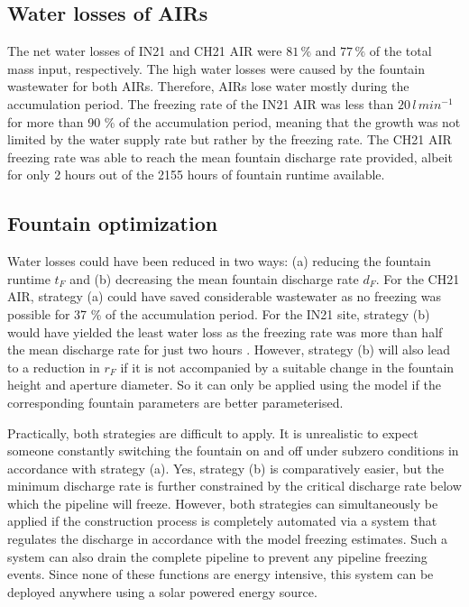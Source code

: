 \documentclass[utf8]{frontiersSCNS}
\begin{document}
\subsection{Water losses of AIRs}

The net water losses of IN21 and CH21 AIR were $81\,\%$ and $77\,\%$ of the total mass input, respectively. The
high water losses were caused by the fountain wastewater for both AIRs. Therefore, AIRs lose water mostly
during the accumulation period. The freezing rate of the IN21 AIR was less than $20 \, l\,min^{-1}$ for more
than 90 \% of the accumulation period, meaning that the growth was not limited by the water supply rate but
rather by the freezing rate. The CH21 AIR freezing rate was able to reach the mean fountain discharge rate
provided, albeit for only 2 hours out of the 2155 hours of fountain runtime available. 


\subsection{Fountain optimization}

Water losses could have been reduced in two ways: (a) reducing the fountain runtime $t_F$ and (b) decreasing the
mean fountain discharge rate $d_F$. For the CH21 AIR, strategy (a) could have saved considerable wastewater as no
freezing was possible for 37 \% of the accumulation period. For the IN21 site, strategy (b) would have yielded
the least water loss as the freezing rate was more than half the mean discharge rate for just two hours . However,
strategy (b) will also lead to a reduction in $r_F$ if it is not accompanied by a suitable change in the
fountain height and aperture diameter. So it can only be applied using the model if the corresponding fountain
parameters are better parameterised.

Practically, both strategies are difficult to apply. It is unrealistic to expect someone constantly
switching the fountain on and off under subzero conditions in accordance with strategy (a). Yes, strategy (b) is
comparatively easier, but the minimum discharge rate is further constrained by the critical discharge rate below
which the pipeline will freeze. However, both strategies can simultaneously be applied if the construction
process is completely automated via a system that regulates the discharge in accordance with the model freezing
estimates. Such a system can also drain the complete pipeline to prevent any pipeline freezing events. Since
none of these functions are energy intensive, this system can be deployed anywhere using a solar powered energy
source.
\end{document}
